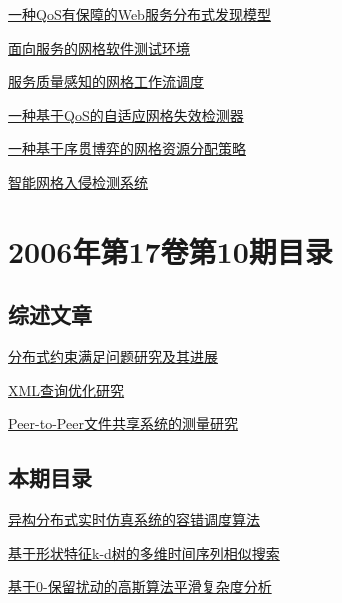 \documentclass[a4paper]{article}
\begin{document}
\href{http://www.jos.org.cn/ch/reader/download_pdf.aspx?file_no=20061111&year_id=2006&quarter_id=11&falg=1}{一种QoS有保障的Web服务分布式发现模型}

\href{http://www.jos.org.cn/ch/reader/download_pdf.aspx?file_no=20061112&year_id=2006&quarter_id=11&falg=1}{面向服务的网格软件测试环境}

\href{http://www.jos.org.cn/ch/reader/download_pdf.aspx?file_no=20061113&year_id=2006&quarter_id=11&falg=1}{服务质量感知的网格工作流调度}

\href{http://www.jos.org.cn/ch/reader/download_pdf.aspx?file_no=20061115&year_id=2006&quarter_id=11&falg=1}{一种基于QoS的自适应网格失效检测器}

\href{http://www.jos.org.cn/ch/reader/download_pdf.aspx?file_no=20061116&year_id=2006&quarter_id=11&falg=1}{一种基于序贯博弈的网格资源分配策略}

\href{http://www.jos.org.cn/ch/reader/download_pdf.aspx?file_no=20061117&year_id=2006&quarter_id=11&falg=1}{智能网格入侵检测系统}


\section{\textbf{2006年第17卷第10期目录}}
\subsection{综述文章}
\href{http://www.jos.org.cn/ch/reader/download_pdf.aspx?file_no=20061001&year_id=2006&quarter_id=10&falg=1}{分布式约束满足问题研究及其进展}

\href{http://www.jos.org.cn/ch/reader/download_pdf.aspx?file_no=20061006&year_id=2006&quarter_id=10&falg=1}{XML查询优化研究}

\href{http://www.jos.org.cn/ch/reader/download_pdf.aspx?file_no=20061011&year_id=2006&quarter_id=10&falg=1}{Peer-to-Peer文件共享系统的测量研究}

\subsection{本期目录}
\href{http://www.jos.org.cn/ch/reader/download_pdf.aspx?file_no=20061002&year_id=2006&quarter_id=10&falg=1}{异构分布式实时仿真系统的容错调度算法}

\href{http://www.jos.org.cn/ch/reader/download_pdf.aspx?file_no=20061003&year_id=2006&quarter_id=10&falg=1}{基于形状特征k-d树的多维时间序列相似搜索}

\href{http://www.jos.org.cn/ch/reader/download_pdf.aspx?file_no=20061004&year_id=2006&quarter_id=10&falg=1}{基于0-保留扰动的高斯算法平滑复杂度分析}
\end{document}

